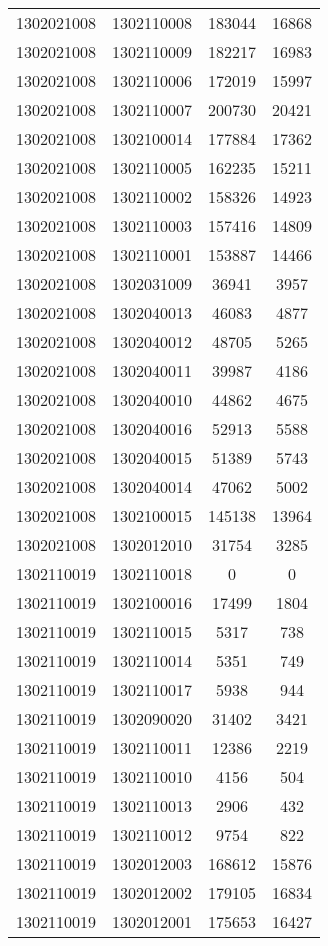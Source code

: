 \begin{longtable}[h]{llcc}
		1302021008 & 1302110008 & 183044 & 16868\\
		1302021008 & 1302110009 & 182217 & 16983\\
		1302021008 & 1302110006 & 172019 & 15997\\
		1302021008 & 1302110007 & 200730 & 20421\\
		1302021008 & 1302100014 & 177884 & 17362\\
		1302021008 & 1302110005 & 162235 & 15211\\
		1302021008 & 1302110002 & 158326 & 14923\\
		1302021008 & 1302110003 & 157416 & 14809\\
		1302021008 & 1302110001 & 153887 & 14466\\
		1302021008 & 1302031009 & 36941 & 3957\\
		1302021008 & 1302040013 & 46083 & 4877\\
		1302021008 & 1302040012 & 48705 & 5265\\
		1302021008 & 1302040011 & 39987 & 4186\\
		1302021008 & 1302040010 & 44862 & 4675\\
		1302021008 & 1302040016 & 52913 & 5588\\
		1302021008 & 1302040015 & 51389 & 5743\\
		1302021008 & 1302040014 & 47062 & 5002\\
		1302021008 & 1302100015 & 145138 & 13964\\
		1302021008 & 1302012010 & 31754 & 3285\\
		1302110019 & 1302110018 & 0 & 0\\
		1302110019 & 1302100016 & 17499 & 1804\\
		1302110019 & 1302110015 & 5317 & 738\\
		1302110019 & 1302110014 & 5351 & 749\\
		1302110019 & 1302110017 & 5938 & 944\\
		1302110019 & 1302090020 & 31402 & 3421\\
		1302110019 & 1302110011 & 12386 & 2219\\
		1302110019 & 1302110010 & 4156 & 504\\
		1302110019 & 1302110013 & 2906 & 432\\
		1302110019 & 1302110012 & 9754 & 822\\
		1302110019 & 1302012003 & 168612 & 15876\\
		1302110019 & 1302012002 & 179105 & 16834\\
		1302110019 & 1302012001 & 175653 & 16427\\

\end{longtable}
